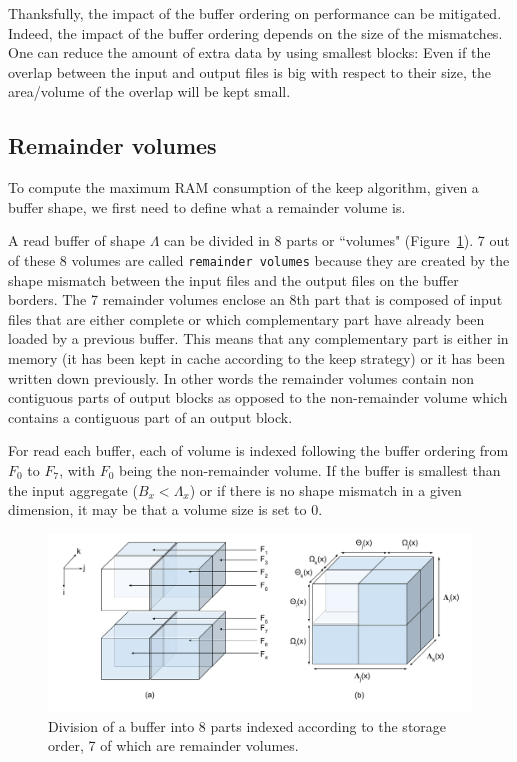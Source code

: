 \documentclass[sigconf, nonacm]{acmart}
\begin{document}
Thanksfully, the impact of the buffer ordering on performance can be
mitigated. Indeed, the impact of the buffer ordering depends on the size of the
mismatches. One can reduce the amount of extra data by using smallest blocks: Even
if the overlap between the input and output files is big with respect to their
size, the area/volume of the overlap will be kept small.

\subsection{Remainder volumes}
To compute the maximum RAM consumption of the keep algorithm, given a
buffer shape, we first need to define what a remainder volume is.

A read buffer of shape $\Lambda$ can be divided in
8 parts or ``volumes" (Figure~\ref{fig:nomenclature_overlaps}).
7 out of these 8 volumes are called \texttt{remainder volumes} because
they are created by the shape mismatch between the input files and the output files on
the buffer borders.
The 7 remainder volumes enclose an 8th part that is composed of
input files that are either complete or which complementary part have already
been loaded by a previous buffer. This means that any complementary part is either
in memory (it has been kept in cache according to the keep strategy) or it has
been written down previously.
In other words the remainder volumes contain non contiguous parts of output blocks
as opposed to the non-remainder volume which contains a contiguous part of
an output block.

For read each buffer, each of volume
is indexed following the buffer ordering from $F_0$ to $F_7$, with $F_0$ being the
non-remainder volume. If the buffer is smallest than the input aggregate
($B_x<\Lambda_x$) or if there is no shape mismatch in a given dimension,
it may be that a volume size is set to 0.

\begin{figure}[h]
\centering
\includegraphics[scale=0.4]{./figures/new/nomenclature_overlaps.png}
\caption{Division of a buffer into 8 parts indexed according to the storage
order, 7 of which are remainder volumes.}
\label{fig:nomenclature_overlaps}
\end{figure}
\end{document}
